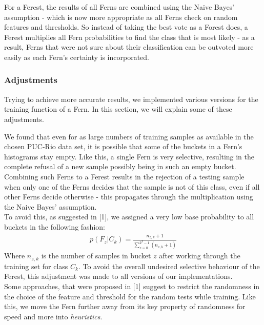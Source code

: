 \documentclass[twocolumn]{article}
\begin{document}
For a Ferest, the results of all Ferns are combined using the Naive Bayes' assumption - which is now more appropriate as all Ferns check on random features and thresholds. So instead of taking the best vote as a Forest does, a Ferest multiplies all Fern probabilities to find the class that is most likely - as a result, Ferns that were not sure about their classification can be outvoted more easily as each Fern's certainty is incorporated.

\subsubsection{Adjustments}

Trying to achieve more accurate results, we implemented various versions for the training function of a Fern. In this section, we will explain some of these adjustments.

We found that even for as large numbers of training samples as available in the chosen PUC-Rio data set, it is possible that some of the buckets in a Fern's histograms stay empty. Like this, a single Fern is very selective, resulting in the complete refusal of a new sample possibly being in such an empty bucket. Combining such Ferns to a Ferest results in the rejection of a testing sample when only one of the Ferns decides that the sample is not of this class, even if all other Ferns decide otherwise - this propagates through the multiplication using the Naive Bayes' assumption.\\
To avoid this, as suggested in [1], we assigned a very low base probability to all buckets in the following fashion:
\begin{align*}
p(F_z\vert C_k) = \frac{n_{z,k}+1}{\sum_{z=0}^{2^S-1}(n_{z,k}+1)}
\end{align*}
Where $n_{z,k}$ is the number of samples in bucket $z$ after working through the training set for class $C_k$. To avoid the overall undesired selective behaviour of the Ferest, this adjustment was made to all versions of our implementations.\\

Some approaches, that were proposed in [1] suggest to restrict the randomness in the choice of the feature and threshold for the random tests while training. Like this, we move the Fern further away from its key property of randomness for speed and more into \textit{heuristics}.
\end{document}
